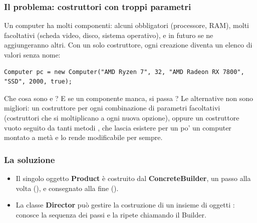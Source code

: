 
\subsubsection*{Il problema: costruttori con troppi parametri}

Un computer ha molti componenti: alcuni obbligatori (processore, RAM), molti facoltativi (scheda video, disco, sistema
operativo), e in futuro se ne aggiungeranno altri. Con un solo costruttore, ogni creazione diventa un elenco di valori
senza nome:
\begin{lstlisting}[style=java]
Computer pc = new Computer("AMD Ryzen 7", 32, "AMD Radeon RX 7800", "SSD", 2000, true);
\end{lstlisting}
Che cosa sono  e ? E se un componente manca, si passa ? Le alternative non sono migliori:
un costruttore per ogni combinazione di parametri facoltativi (costruttori che si moltiplicano a ogni nuova opzione), oppure
un costruttore vuoto seguito da tanti metodi , che lascia esistere per un po' un computer montato a metà e lo
rende modificabile per sempre.

\subsubsection*{La soluzione}

\begin{itemize}
  \item Il singolo oggetto \textbf{Product} è costruito dal \textbf{ConcreteBuilder}, un passo alla volta
        (), e consegnato alla fine ().
  \item La classe \textbf{Director} può gestire la costruzione di un insieme di oggetti : conosce la sequenza
        dei passi e la ripete chiamando il Builder.
\end{itemize}

\begin{center}
\end{center}

